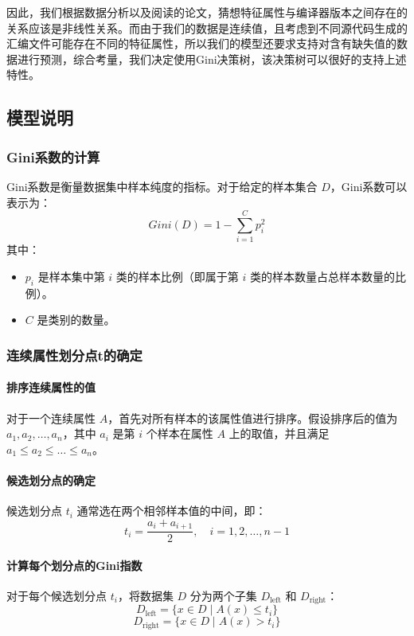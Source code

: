 因此，我们根据数据分析以及阅读的论文，猜想特征属性与编译器版本之间存在的关系应该是非线性关系。而由于我们的数据是连续值，且考虑到不同源代码生成的汇编文件可能存在不同的特征属性，所以我们的模型还要求支持对含有缺失值的数据进行预测，综合考量，我们决定使用Gini决策树，该决策树可以很好的支持上述特性。
    \subsection{模型说明}
    \subsubsection{Gini系数的计算}
Gini系数是衡量数据集中样本纯度的指标。对于给定的样本集合 \(D\)，Gini系数可以表示为：
\begin{equation}
Gini(D) = 1 - \sum_{i=1}^{C} p_i^2
\end{equation}
其中：
\begin{itemize}
  \item \(p_i\) 是样本集中第 \(i\) 类的样本比例（即属于第 \(i\) 类的样本数量占总样本数量的比例）。
  \item \(C\) 是类别的数量。
\end{itemize}





\subsubsection{连续属性划分点t的确定}

\paragraph{排序连续属性的值}
对于一个连续属性 \(A\)，首先对所有样本的该属性值进行排序。假设排序后的值为 \(a_1, a_2, \dots, a_n\)，其中 \(a_i\) 是第 \(i\) 个样本在属性 \(A\) 上的取值，并且满足 \(a_1 \leq a_2 \leq \dots \leq a_n\)。

\paragraph{候选划分点的确定}
候选划分点 \(t_i\) 通常选在两个相邻样本值的中间，即：
\begin{equation}
t_i = \frac{a_i + a_{i+1}}{2}, \quad i = 1, 2, \dots, n-1
\end{equation}

\paragraph{计算每个划分点的Gini指数}
对于每个候选划分点 \(t_i\)，将数据集 \(D\) 分为两个子集 \(D_{\text{left}}\) 和 \(D_{\text{right}}\)：
\begin{equation}
D_{\text{left}} = \{x \in D \mid A(x) \leq t_i\}
\end{equation}
\begin{equation}
D_{\text{right}} = \{x \in D \mid A(x) > t_i\}
\end{equation}

